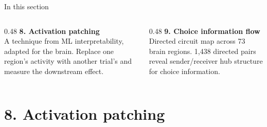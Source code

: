 \documentclass[aspectratio=169,11pt]{beamer}
\begin{document}
\begin{frame}{In this section}
\begin{columns}[T]
\begin{column}{0.48\textwidth}
\textbf{8. Activation patching}\\[0.2em]
{\small A technique from ML interpretability, adapted for the brain. Replace one region's activity with another trial's and measure the downstream effect.}
\end{column}
\begin{column}{0.48\textwidth}
\textbf{9. Choice information flow}\\[0.2em]
{\small Directed circuit map across 73 brain regions. 1,438 directed pairs reveal sender/receiver hub structure for choice information.}
\end{column}
\end{columns}
\end{frame}

\section{8. Activation patching}\hypertarget{sec:8}{}
\end{document}

